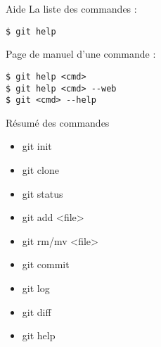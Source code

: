 \begin{frame}[fragile]{Aide}
La liste des commandes :
\begin{small}
\begin{verbatim}
$ git help
\end{verbatim}
\end{small}

\bigskip
Page de manuel d'une commande :
\begin{small}
\begin{verbatim}
$ git help <cmd>
$ git help <cmd> --web
$ git <cmd> --help
\end{verbatim}
\end{small}
\end{frame}

\begin{frame}{Résumé des commandes}
  \begin{ttfamily}
    \begin{itemize}
      \item git init
      \item git clone
      \item git status
      \item git add <file>
      \item git rm/mv <file>
      \item git commit
      \item git log
      \item git diff
      \item git help
    \end{itemize}
  \end{ttfamily}
\end{frame}
